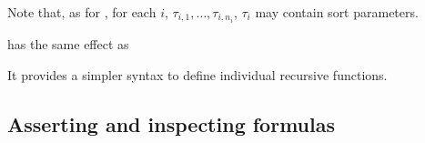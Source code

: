 \begin{description}
Note that, as for , 
for each $i$, $\tau_{i,1}, \ldots, \tau_{i,n_i}$, $\tau_i$ may contain sort parameters.

\smallskip

%
\item[\expr{(define-fun-rec $f$ (($x_1$ $\tau_1$) $\cdots$ ($x_n$ $\tau_n$)) $\tau$ $t$)}]
has the same effect as
\begin{center}
\end{center}
It provides a simpler syntax to define individual recursive functions.

\end{description}


\subsection{Asserting and inspecting formulas} \label{sec:assert}

